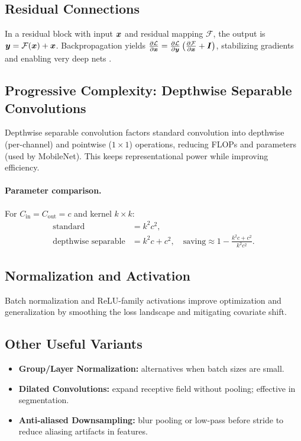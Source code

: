 \subsection{Residual Connections}
In a residual block with input $\boldsymbol{x}$ and residual mapping $\mathcal{F}$, the output is $\boldsymbol{y}=\mathcal{F}(\boldsymbol{x})+\boldsymbol{x}$. Backpropagation yields $\frac{\partial \mathcal{L}}{\partial \boldsymbol{x}}=\frac{\partial \mathcal{L}}{\partial \boldsymbol{y}}\left(\frac{\partial \mathcal{F}}{\partial \boldsymbol{x}}+\boldsymbol{I}\right)$, stabilizing gradients and enabling very deep nets \cite{He2016}.

\subsection{Progressive Complexity: Depthwise Separable Convolutions}
Depthwise separable convolution factors standard convolution into depthwise (per-channel) and pointwise ($1\times1$) operations, reducing FLOPs and parameters (used by MobileNet). This keeps representational power while improving efficiency.

\paragraph{Parameter comparison.} For $C_{\text{in}}=C_{\text{out}}=c$ and kernel $k\times k$:
\begin{align}
\text{standard} &= k^2 c^2,\\
\text{depthwise separable} &= k^2 c + c^2,\quad \text{saving} \approx 1 - \frac{k^2 c + c^2}{k^2 c^2}.
\end{align}

\subsection{Normalization and Activation}
Batch normalization \cite{Ioffe2015} and ReLU-family activations improve optimization and generalization by smoothing the loss landscape and mitigating covariate shift.

\subsection{Other Useful Variants}
\begin{itemize}
    \item \textbf{Group/Layer Normalization:} alternatives when batch sizes are small.
    \item \textbf{Dilated Convolutions:} expand receptive field without pooling; effective in segmentation.
    \item \textbf{Anti-aliased Downsampling:} blur pooling or low-pass before stride to reduce aliasing artifacts in features.
\end{itemize}

